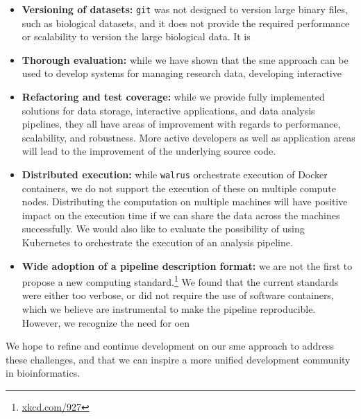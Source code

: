 \begin{itemize} 

\item \textbf{Versioning of datasets:} \texttt{git} was not designed to version
large binary files, such as biological datasets, and it does not provide the
required performance or scalability to version the large biological data. It is 

\item \textbf{Thorough evaluation:} while we have shown that the \gls{sme}
approach can be used to develop systems for managing research data, developing
interactive 

\item \textbf{Refactoring and test coverage:} while we provide fully implemented
solutions for data storage, interactive applications, and data analysis
pipelines, they all have areas of improvement with regards to performance,
scalability, and robustness. More active developers as well as application areas
will lead to the improvement of the underlying source code. 

\item \textbf{Distributed execution:} while \texttt{walrus} orchestrate
execution of Docker containers, we do not support the execution of these on
multiple compute nodes. Distributing the computation on multiple machines will
have positive impact on the execution time if we can share the data across the
machines successfully. We would also like to evaluate the possibility of using
Kubernetes to orchestrate the execution of an analysis pipeline. 


\item \textbf{Wide adoption of a pipeline description format:} we are not the
first to propose a new computing standard.\footnote{\url{xkcd.com/927}} We found
that the current standards were either too verbose, or did not require the use
of software containers, which we believe are instrumental to make the pipeline
reproducible. However, we recognize the need for oen 

\end{itemize} 

We hope to refine and continue development on our \gls{sme} approach to address
these challenges, and that we can inspire a more unified development community
in bioinformatics. 

